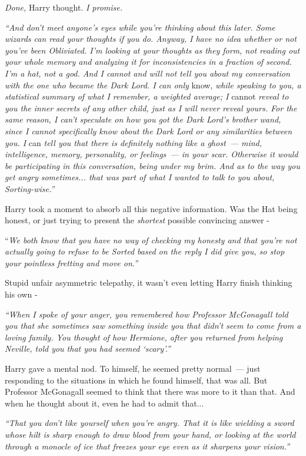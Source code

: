 \emph{Done,} Harry thought. \emph{I promise.}

\emph{``And don't meet anyone's eyes while you're thinking about this later. Some wizards can read your thoughts if you do. Anyway, I have no idea whether or not you've been Obliviated. I'm looking at your thoughts as they form, not reading out your whole memory and analyzing it for inconsistencies in a fraction of second. I'm a hat, not a god. And I cannot and will not tell you about my conversation with the one who became the Dark Lord. I can only} know, \emph{while speaking to you, a statistical summary of what I remember, a weighted average; I} cannot \emph{reveal to you the inner secrets of any other child, just as I will never reveal yours. For the same reason, I can't speculate on how you got the Dark Lord's brother wand, since I cannot specifically know about the Dark Lord or any similarities between you. I} can \emph{tell you that there is definitely nothing like a ghost~--- mind, intelligence, memory, personality, or feelings~--- in your scar. Otherwise it would be participating in this conversation, being under my brim. And as to the way you get angry sometimes... that was part of what I wanted to talk to you about, Sorting-wise.''}

Harry took a moment to absorb all this negative information. Was the Hat being honest, or just trying to present the \emph{shortest} possible convincing answer -

``\emph{We both know that you have no way of checking my honesty and that you're not actually going to refuse to be Sorted based on the reply I did give you, so stop your pointless fretting and move on.''}

Stupid unfair asymmetric telepathy, it wasn't even letting Harry finish thinking his own -

\emph{``When I spoke of your anger, you remembered how Professor McGonagall told you that she sometimes saw something inside you that didn't seem to come from a loving family. You thought of how Hermione, after you returned from helping Neville, told you that you had seemed `scary'.''}

Harry gave a mental nod. To himself, he seemed pretty normal~--- just responding to the situations in which he found himself, that was all. But Professor McGonagall seemed to think that there was more to it than that. And when he thought about it, even he had to admit that...

\emph{``That you don't like yourself when you're angry. That it is like wielding a sword whose hilt is sharp enough to draw blood from your hand, or looking at the world through a monocle of ice that freezes your eye even as it sharpens your vision.''}

